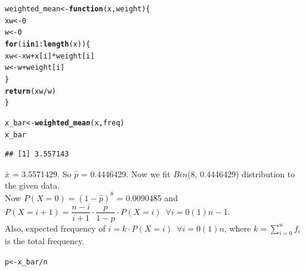 \documentclass[11pt, a4paper]{article}\usepackage[]{graphicx}\usepackage[]{xcolor}
\makeatletter
\newcommand{\hlnum}[1]{\textcolor[rgb]{0.686,0.059,0.569}{#1}}%
\newcommand{\hlopt}[1]{\textcolor[rgb]{0,0,0}{#1}}%
\newcommand{\hldef}[1]{\textcolor[rgb]{0.345,0.345,0.345}{#1}}%
\newcommand{\hlkwa}[1]{\textcolor[rgb]{0.161,0.373,0.58}{\textbf{#1}}}%
\newcommand{\hlkwb}[1]{\textcolor[rgb]{0.69,0.353,0.396}{#1}}%
\newcommand{\hlkwc}[1]{\textcolor[rgb]{0.333,0.667,0.333}{#1}}%
\newcommand{\hlkwd}[1]{\textcolor[rgb]{0.737,0.353,0.396}{\textbf{#1}}}%
\newenvironment{kframe}{%
 \def\at@end@of@kframe{}%
 \ifinner\ifhmode%
  \def\at@end@of@kframe{\end{minipage}}%
  \begin{minipage}{\columnwidth}%
 \fi\fi%
 \def\FrameCommand##1{\hskip\@totalleftmargin \hskip-\fboxsep
 \colorbox{shadecolor}{##1}\hskip-\fboxsep
     \hskip-\linewidth \hskip-\@totalleftmargin \hskip\columnwidth}%
 \MakeFramed {\advance\hsize-\width
   \@totalleftmargin\z@ \linewidth\hsize
   \@setminipage}}%
 {\par\unskip\endMakeFramed%
 \at@end@of@kframe}
\newenvironment{knitrout}{}{} %
\makeatother
\begin{document}
\begin{knitrout}
\color{fgcolor}\begin{kframe}
\begin{alltt}
\hldef{weighted_mean} \hlkwb{<-} \hlkwa{function}\hldef{(}\hlkwc{x}\hldef{,} \hlkwc{weight}\hldef{)\{}
  \hldef{xw} \hlkwb{<-} \hlnum{0}
  \hldef{w} \hlkwb{<-} \hlnum{0}
  \hlkwa{for} \hldef{(i} \hlkwa{in} \hlnum{1}\hlopt{:}\hlkwd{length}\hldef{(x)) \{}
    \hldef{xw} \hlkwb{<-} \hldef{xw} \hlopt{+} \hldef{x[i]} \hlopt{*} \hldef{weight[i]}
    \hldef{w} \hlkwb{<-} \hldef{w} \hlopt{+} \hldef{weight[i]}
  \hldef{\}}
  \hlkwd{return}\hldef{(xw} \hlopt{/} \hldef{w)}
\hldef{\}}
\end{alltt}
\end{kframe}
\end{knitrout}

\begin{knitrout}
\color{fgcolor}\begin{kframe}
\begin{alltt}
\hldef{x_bar} \hlkwb{<-} \hlkwd{weighted_mean}\hldef{(x, freq)}
\hldef{x_bar}
\end{alltt}
\begin{verbatim}
## [1] 3.557143
\end{verbatim}
\end{kframe}
\end{knitrout}

$\bar{x}$ = 3.5571429. So $\hat{p}$ = 0.4446429. Now we fit $Bin$(8, 0.4446429) distribution to the given data. \\

Now $P(X = 0) = (1-\hat{p})^8$ = 0.0090485 and \\

$P(X = i + 1) = \dfrac{n-i}{i + 1} \cdot \dfrac{p}{1-p} \cdot P(X = i) \,\,\, \forall i = 0(1)n-1.$ \\

Also, expected frequency of $i = k \cdot P(X = i) \,\,\, \forall i = 0(1)n$, where $k = \sum \limits_{i = 0}^{n} f_i$ is the total frequency.

\begin{knitrout}
\color{fgcolor}\begin{kframe}
\begin{alltt}
\hldef{p} \hlkwb{<-} \hldef{x_bar} \hlopt{/} \hldef{n}
\end{alltt}
\end{kframe}
\end{knitrout}
\end{document}
